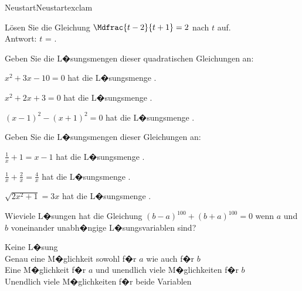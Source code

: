 \begin{MXContent}{Neustart}{Neustart}{exclam}
\begin{MExercise}
L\"osen Sie die Gleichung $\Mdfrac{t-2}{t+1}=2$ nach $t$ auf.\ \\
Antwort: $t$ = \: .
\end{MExercise}

\begin{MExercise}
Geben Sie die L�sungsmengen dieser quadratischen Gleichungen an:
\begin{MExerciseItems}
\item{$x^2+3x-10=0$ hat die L�sungsmenge .}
\item{$x^2+2x+3=0$ hat die L�sungsmenge .}
\item{$(x-1)^2-(x+1)^2=0$ hat die L�sungsmenge .}
\end{MExerciseItems}
\end{MExercise}


\begin{MExercise}
Geben Sie die L�sungsmengen dieser Gleichungen an:
\begin{MExerciseItems}
\item{$\frac1x+1=x-1$ hat die L�sungsmenge .}
\item{$\frac1x+\frac2x=\frac4x$ hat die L�sungsmenge .}
\item{$\sqrt{2x^2+1}=3x$ hat die L�sungsmenge .}
\end{MExerciseItems}

Wieviele L�sungen hat die Gleichung $(b-a)^{100}+(b+a)^{100}=0$ wenn $a$ und $b$ voneinander unabh�ngige L�sungsvariablen sind?\\
\begin{MQuestionGroup}
 Keine L�sung\ \\
 Genau eine M�glichkeit sowohl f�r $a$ wie auch f�r $b$\ \\
 Eine M�glichkeit f�r $a$ und unendlich viele M�glichkeiten f�r $b$\ \\
 Unendlich viele M�glichkeiten f�r beide Variablen
\end{MQuestionGroup}\ \\
\end{MExercise}



\end{MXContent}
